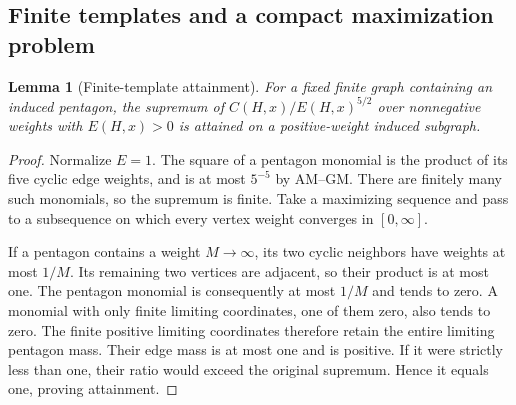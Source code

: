 \documentclass[11pt]{amsart}
\newtheorem{lemma}[theorem]{Lemma}
\theoremstyle{definition}
\theoremstyle{remark}
\begin{document}
\subsection{Finite templates and a compact maximization problem}

\begin{lemma}[Finite-template attainment]\label{lem:finite-attainment}
For a fixed finite graph containing an induced pentagon, the supremum of
\(C(H,x)/E(H,x)^{5/2}\) over nonnegative weights with \(E(H,x)>0\) is
attained on a positive-weight induced subgraph.
\end{lemma}
\begin{proof}
Normalize \(E=1\). The square of a pentagon monomial is the product of its
five cyclic edge weights, and is at most \(5^{-5}\) by AM--GM. There are
finitely many such monomials, so the supremum is finite. Take a maximizing
sequence and pass to a subsequence on which every vertex weight converges
in \([0,\infty]\).

If a pentagon contains a weight \(M\to\infty\), its two cyclic neighbors
have weights at most \(1/M\). Its remaining two vertices are adjacent, so
their product is at most one. The pentagon monomial is consequently at
most \(1/M\) and tends to zero. A monomial with only finite limiting
coordinates, one of them zero, also tends to zero. The finite positive
limiting coordinates therefore retain the entire limiting pentagon mass.
Their edge mass is at most one and is positive. If it were strictly less
than one, their ratio would exceed the original supremum. Hence it equals
one, proving attainment.
\end{proof}
\end{document}
